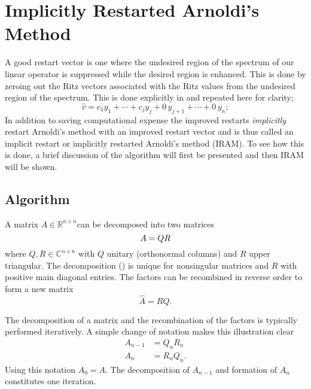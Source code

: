 \chapter{Implicitly Restarted Arnoldi's Method\label{ch:IRAM} }
A good restart vector is one where the undesired region of the spectrum of our linear operator is suppressed while the desired region is enhanced.  This is done by zeroing out the Ritz vectors associated with the Ritz values from the undesired region of the spectrum.  This is done explicitly in  and repeated here for clarity;
\begin{equation}
    \hat{v} = c_1y_1 + \cdots + c_jy_j + 0\,y_{j+1} + \cdots + 0\,y_n;
    \label{eq:RestartVector}
\end{equation} 
In addition to saving computational expense the improved restarts \emph{implicitly} restart Arnoldi's method with an improved restart vector and is thus called an implicit restart or implicitly restarted Arnoldi's method (IRAM).  To see how this is done, a brief discussion of the \QR algorithm will first be presented and then IRAM will be shown.

\section*{\QR Algorithm} \label{sec:QRAlgorithm}
A matrix $A \in \mathbb{R}^{n \times n}$can be decomposed into two matrices
\begin{equation}
    A = QR
    \label{eq:QRDecomposition}
\end{equation}
where $Q, R \in \mathbb{C}^{n \times n}$ with $Q$ unitary (orthonormal columns) and $R$ upper triangular.  The \QR decomposition () is unique \citep[see][Chapter 3, pg. 204]{Watkins:2002Funda-0} for nonsingular matrices and $R$ with positive main diagonal entries.  The \QR factors can be recombined in reverse order to form a new matrix 
\begin{equation}
    \hat{A} = RQ.
\end{equation}

The decomposition of a matrix and the recombination of the factors is typically performed iteratively.  A simple change of notation makes this illustration clear
\begin{subequations}
    \label{eq:QRIteration}
    \begin{align}
        A_{n-1} &= Q_nR_n \label{eq:QRFactIter} \\
        A_{n} &= R_nQ_n. \label{eq:QRRecombineIter}
    \end{align}
\end{subequations}
Using this notation $A_0 = A$.  The decomposition of $A_{n-1}$ and formation of $A_n$ constitutes one \QR iteration.

